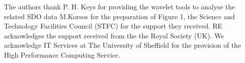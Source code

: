 \documentclass[linenumbers]{aastex63}
\begin{document}
The authors thank P. H. Keys for providing the wavelet tools to analyse the related SDO data M.Korsos for the preparation of Figure 1, the Science and Technology Facilities Council (STFC) for the support they received.  RE acknowledges the support received from the the Royal Society (UK). We acknowledge IT Services at The University of Sheffield for the provision of the High Performance Computing Service.


%






\end{document}
